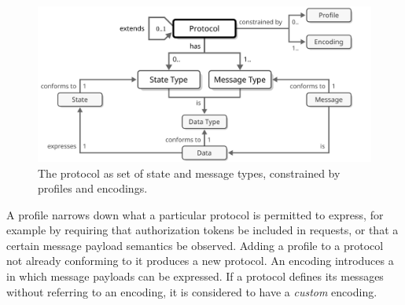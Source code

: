 \begin{figure}[ht!]
  \centering
  \includegraphics[scale=0.9]{figures/protocol}
  \caption{
    The protocol as set of state and message types, constrained by profiles and encodings.
  }
  \label{fig:protocol}
\end{figure}

A profile narrows down what a particular protocol is permitted to express, for example by requiring that authorization tokens be included in requests, or that a certain message payload semantics be observed.
Adding a profile to a protocol not already conforming to it produces a new protocol.
An encoding introduces a  in which message payloads can be expressed.
If a protocol defines its messages without referring to an encoding, it is considered to have a \textit{custom} encoding.
